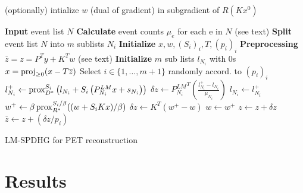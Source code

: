 (optionally) intialize $w$ (dual of gradient) in subgradient of $R(Kx^0)$



\begin{algorithm}[t]
\begin{algorithmic}[1]
\small
\State \textbf{Input} event list $N$
\State \textbf{Calculate} event counts $\mu_e$ for each e in $N$ (see text)
\State \textbf{Split} event list $N$ into $m$ sublists $N_i$
\State \textbf{Initialize} $x,w,(S_i)_i,T,(p_i)_i$
\State \textbf{Preprocessing} $\overline{z} = z = P^T y + K^T w$ (see text)
\State \textbf{Initialize} $m$ sub lists $l_{N_i}$ with 0s
\Repeat
	\State $x = \operatorname{proj}_{\geq 0} (x - T \overline{z})$
	\State Select $i \in \{1,\ldots,m+1\}$ randomly accord. to $(p_i)_i$
	  \State $l_{N_i}^+ \gets \operatorname{prox}_{D^*}^{S_i} \left( l_{N_i} + S_i \left(P^{LM}_{N_i} x + s_{N_i} \right) \right)$
	  \State $\delta z \gets {P^{LM}_{N_i}}^T \left(\frac{l_{N_i}^+ - l_{N_i}}{\mu_{N_i}}\right)$
	  \State $l_{N_i} \gets l_{N_i}^+$
  \Else
	  \State $w^+ \gets \beta \operatorname{prox}_{R^*}^{S_i/\beta} ((w + S_i  K x)/\beta)$
	  \State $\delta z \gets K^T \left(w^+ - w\right)$
	  \State $w \gets w^+$
  \EndIf
	\State $z \gets z + \delta z$
	\State $\overline{z} \gets  z + (\delta z/p_i)$
\State {}
\end{algorithmic}
\caption{LM-SPDHG for PET reconstruction}
\label{alg:lmspdhg}
\end{algorithm}





\section{Results}

